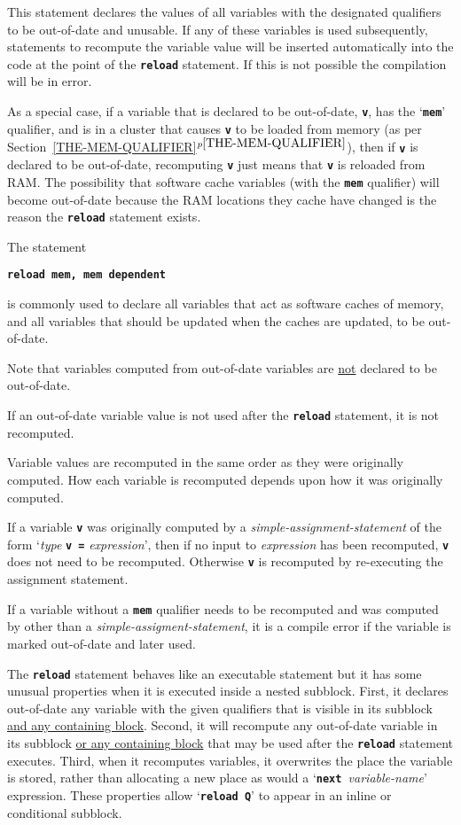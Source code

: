 \documentclass[12pt]{article}
\newcommand{\TT}[1]{{\tt \bfseries #1}}
\newcommand{\itemref}[1]{\ref{#1}$^{p\pageref{#1}}$}
\begin{document}
This statement declares the values of all variables with the designated
qualifiers to be out-of-date and unusable.  If any of these variables
is used subsequently, statements to recompute the variable value
will be inserted automatically into the code at the point of the
\TT{reload} statement.  If this is not possible the compilation will
be in error.

As a special case, if a variable that is declared to be out-of-date,
\TT{v}, has the `\TT{mem}' qualifier, and is in
a cluster that causes \TT{v} to be loaded from memory
(as per Section~\itemref{THE-MEM-QUALIFIER}), then if \TT{v} is declared
to be out-of-date, recomputing \TT{v} just means that \TT{v}
is reloaded from RAM.  The possibility that software cache
variables (with the \TT{mem} qualifier) will become out-of-date because
the RAM locations they cache have changed is the reason the \TT{reload}
statement exists.

The statement
\begin{center}
\TT{reload mem, mem dependent}
\end{center}
is commonly used to declare all
variables that act as software caches of memory, and all variables
that should be updated when the caches are updated, to be out-of-date.

Note that variables computed from out-of-date variables are \underline{not}
declared to be out-of-date.

If an out-of-date variable value is not used after the \TT{reload} statement,
it is not recomputed.

Variable values are recomputed in the same order as they were
originally computed.  How each variable is recomputed depends upon
how it was originally computed.

If a variable \TT{v} was originally computed by
a {\em simple-assignment-statement}
of the form `{\em type} \TT{v =} {\em expression}', then if
no input to {\em expression} has been recomputed, \TT{v} does not
need to be recomputed.  Otherwise \TT{v} is recomputed by re-executing
the assignment statement.

If a variable without a \TT{mem} qualifier needs to be
recomputed and was computed by other than
a {\em simple-assigment-statement}, it is a compile error if the
variable is marked out-of-date and later used.

The \TT{reload} statement behaves like an executable statement but
it has some unusual properties when it is executed inside a
nested subblock.  First, it declares out-of-date any variable with
the given qualifiers that is visible in its subblock \underline{and any
containing block}.
Second, it will recompute any out-of-date variable in its subblock
\underline{or any containing block} that may be used after the
\TT{reload} statement executes.
Third, when it recomputes variables, it overwrites
the place the variable is stored, rather than allocating a new
place as would a `\TT{next~}{\em variable-name}' expression.
These properties allow `\TT{reload Q}' to appear in an inline
or conditional subblock.
\end{document}
